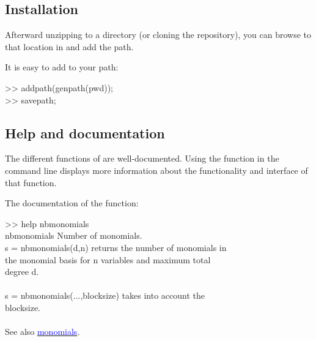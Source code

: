 \documentclass{manual}
\begin{document}
        \subsection{Installation}

            Afterward unzipping \maclab\space to a directory (or cloning the repository), you can browse to that location in \matlab\space and add the path.

            \begin{code}
                It is easy to add \maclab\space to your path:
                \begin{codeblock}
                >> addpath(genpath(pwd)); \\
                >> savepath;
                \end{codeblock}
            \end{code}

        \subsection{Help and documentation}

            The different functions of \maclab\space are well-documented. 
            Using the function  in the command line displays more information about the functionality and interface of that function.

            \begin{code}
               The documentation of the  function:
                \begin{codeblock}
                    >> help \textcolor{string}{nbmonomials} \\ 
                    nbmonomials \tab   Number of monomials. \\
                    \tab s = nbmonomials(d,n) returns the number of monomials in \\
                    \tab the monomial basis for n variables and maximum total \\
                    \tab degree d. \\ \phantom{-} \\
                    \tab s = nbmonomials(...,blocksize) takes into account the \\
                    \tab blocksize. \\ \phantom{-} \\                 
                    \tab See also \underline{\textcolor{blue}{monomials}}.
                \end{codeblock}
            \end{code}
\end{document}
